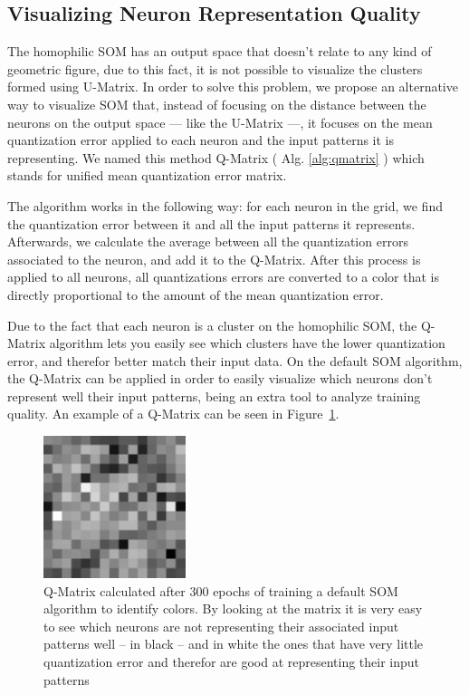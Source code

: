 \subsection{Visualizing Neuron Representation Quality}
\label{sub:visualizing_neuron_representation_quality}
The homophilic \ac{SOM} has an output space that doesn't relate to any kind of geometric figure, due to this fact, it is not possible to visualize the clusters formed using \ac{U-Matrix}. In order to solve this problem, we propose an alternative way to visualize \ac{SOM} that, instead of focusing on the distance between the neurons on the output space --- like the \ac{U-Matrix} ---, it focuses on the mean quantization error applied to each neuron and the input patterns it is representing. We named this method Q-Matrix ( Alg. \ref{alg:qmatrix} ) which stands for unified mean quantization error matrix.



The algorithm works in the following way: for each neuron in the grid, we find the quantization error between it and all the input patterns it represents. Afterwards, we calculate the average between all the quantization errors associated to the neuron, and add it to the Q-Matrix. After this process is applied to all neurons, all quantizations errors are converted to a color that is directly proportional to the amount of the mean quantization error. 

Due to the fact that each neuron is a cluster on the homophilic \ac{SOM}, the Q-Matrix algorithm lets you easily see which clusters have the lower quantization error, and therefor better match their input data. On the default \ac{SOM} algorithm, the Q-Matrix can be applied in order to easily visualize which neurons don't represent well their input patterns, being an extra tool to analyze training quality. An example of a Q-Matrix can be seen in Figure~\ref{fig:som_trqmatrix}.
\begin{figure}[htpb]
  \centering
  \includegraphics[scale=2]{./images/som_training/2_quantmatrix.pdf}
  \caption{Q-Matrix calculated after 300 epochs of training a default \ac{SOM} algorithm to identify colors. By looking at the matrix it is very easy to see which neurons are not representing their associated input patterns well -- in black -- and in white the ones that have very little quantization error and therefor are good at representing their input patterns}
  \label{fig:som_trqmatrix}
\end{figure}

